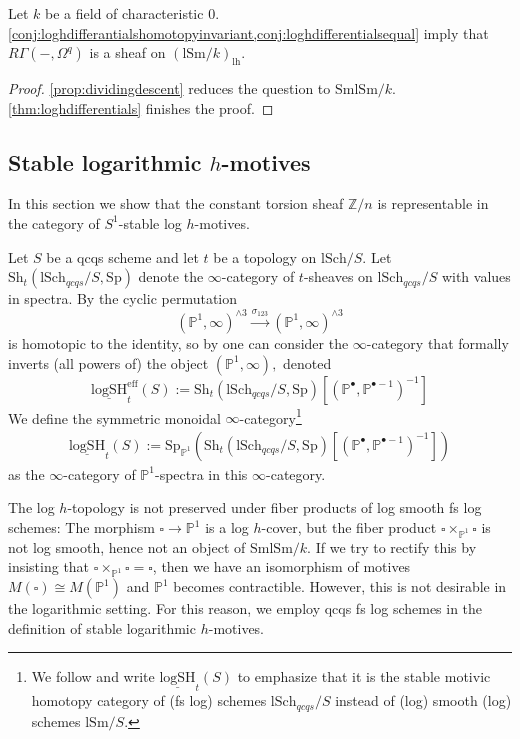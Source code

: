 \documentclass[10pt]{amsart}
\renewcommand{\P}{\mathbb{P}}
\newcommand{\Z}{\mathbb{Z}}
\newcommand{\lh}{\mathrm{lh}}
\newcommand{\SmlSm}{\mathrm{SmlSm}}
\newcommand{\Sh}{\mathrm{Sh}}
\newcommand{\lSm}{\mathrm{lSm}}
\newcommand{\Sp}{\mathrm{Sp}}
\newcommand{\lSch}{\mathrm{lSch}}
\newcommand{\eff}{\mathrm{eff}}
\newcommand{\logSH}{\mathrm{logSH}}
\begin{document}
\begin{corollary}\label{cor:loghsheafificationisaloghsheaf}
Let $k$ be a field of characteristic $0$.
\cref{conj:loghdifferantialshomotopyinvariant,conj:loghdifferentialsequal} 
imply that $R\Gamma(-,\Omega^q)$ is a sheaf on $(\lSm/k)_{\lh}$.
\end{corollary}
\begin{proof}
\cref{prop:dividingdescent} reduces the question to $\SmlSm/k$. 
\cref{thm:loghdifferentials} finishes the proof.
\end{proof}



\subsection{Stable logarithmic \texorpdfstring{$h$}{h}-motives}
\label{subsection:Logarithmic H-Motives}
In this section we show that the constant torsion sheaf $\Z/n$ is representable in the category of $S^1$-stable log $h$-motives.


\begin{definition}
Let $S$ be a qcqs scheme and let $t$ be a topology on $\lSch/S.$
Let $\Sh_t(\lSch_{qcqs}/S,\Sp)$ denote the $\infty$-category of $t$-sheaves on $\lSch_{qcqs}/S$ with values in spectra. By \cite[Proposition 3.2.15]{logSH} the cyclic permutation 
$$(\P^1, \infty)^{\wedge 3} \overset{\sigma_{123}}{\longrightarrow} (\P^1, \infty)^{\wedge 3}$$
is homotopic to the identity, so by \cite[Theorem 2.26]{zbMATH06374152} one can consider the $\infty$-category that formally inverts (all powers of) the object $(\P^1, \infty),$ 
denoted 
$$\underline{\logSH}_t^\eff(S) := \Sh_t(\lSch_{qcqs}/S,\Sp)[(\P^\bullet,\P^{\bullet-1})^{-1}]$$
We define the symmetric monoidal $\infty$-category\footnote{We follow \cite{CD09} and write $\underline{\logSH}_t(S)$ 
to emphasize that it is the stable motivic homotopy category of (fs log) schemes $\lSch_{qcqs}/S$ instead of 
(log) smooth (log) schemes $\lSm/S$.}
\begin{gather*}
\underline{\logSH}_t(S):=
\Sp_{\P^1}(\Sh_t(\lSch_{qcqs}/S,\Sp)[(\P^\bullet,\P^{\bullet-1})^{-1}])
\end{gather*}
as the $\infty$-category of $\P^1$-spectra in this $\infty$-category.
\end{definition}

\begin{remark}\label{rmk:loghtopologynofibreproducts}
The log $h$-topology is not preserved under fiber products of log smooth fs log schemes: 
The morphism $\square \to \P^1$ is a log $h$-cover, 
but the fiber product $\square\times_{\P^1}\square$ is not log smooth, 
hence not an object of $\SmlSm/k.$ 
If we try to rectify this by insisting that
$\square\times_{\P^1}\square = \square$, 
then we have an isomorphism of motives $M(\square)\cong M(\P^1)$ and $\P^1$ becomes contractible.
However, this is not desirable in the logarithmic setting.
For this reason, 
we employ qcqs fs log schemes in the definition of stable logarithmic $h$-motives.
\end{remark}
\end{document}
